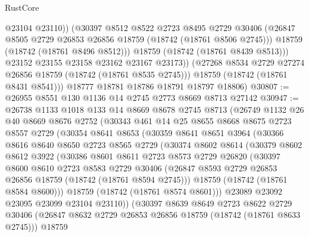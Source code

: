 \begin{lexlean}{RustCore}
\begin{coremodule}
                  @23104
                  @23110))
              (@30397
                @8512
                @8522
                @2723
                @8495
                @2729
                @30406
                (@26847 @8505 @2729 @26853 @26856 @18759 (@18742 (@18761 @8506 @2745)))
                @18759
                (@18742 (@18761 @8496 @8512)))
              @18759
              (@18742 (@18761 @8439 @8513)))
            @23152
            @23155
            @23158
            @23162
            @23167
            @23173))
        (@27268 @8534 @2729 @27274 @26856 @18759 (@18742 (@18761 @8535 @2745)))
        @18759
        (@18742 (@18761 @8431 @8541)))
      @18777
      @18781
      @18786
      @18791
      @18797
      @18806)
@30807 := @26955 @8551 @130 @1136 @14 @2745 @2773 @8669 @8713 @27142
@30947 := @26738
    @1133
    @1018
    @133
    @14
    @8669
    @8678
    @2745
    @8713
    (@26749
      @1132
      @26
      @40
      @8669
      @8676
      @2752
      (@30343
        @461
        @14
        @25
        @8655
        @8668
        @8675
        @2723
        @8557
        @2729
        (@30354
          @8641
          @8653
          (@30359
            @8641
            @8651
            @3964
            (@30366
              @8616
              @8640
              @8650
              @2723
              @8565
              @2729
              (@30374
                @8602
                @8614
                (@30379
                  @8602
                  @8612
                  @3922
                  (@30386
                    @8601
                    @8611
                    @2723
                    @8573
                    @2729
                    @26820
                    (@30397
                      @8600
                      @8610
                      @2723
                      @8583
                      @2729
                      @30406
                      (@26847 @8593 @2729 @26853 @26856 @18759 (@18742 (@18761 @8594 @2745)))
                      @18759
                      (@18742 (@18761 @8584 @8600)))
                    @18759
                    (@18742 (@18761 @8574 @8601)))
                  @23089
                  @23092
                  @23095
                  @23099
                  @23104
                  @23110))
              (@30397
                @8639
                @8649
                @2723
                @8622
                @2729
                @30406
                (@26847 @8632 @2729 @26853 @26856 @18759 (@18742 (@18761 @8633 @2745)))
                @18759

\end{coremodule}
\end{lexlean}
